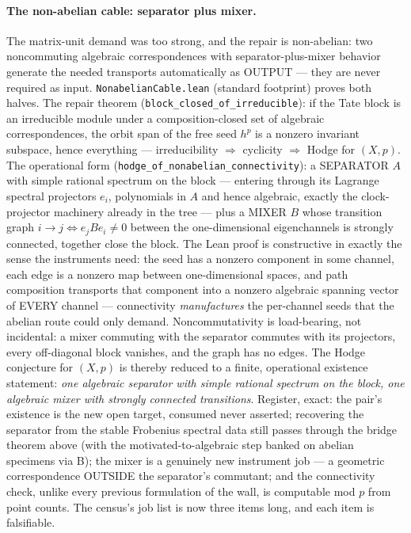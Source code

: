 \documentclass[11pt]{article}
\theoremstyle{definition}
\theoremstyle{remark}
\begin{document}
\paragraph{The non-abelian cable: separator plus mixer.}  The
matrix-unit demand was too strong, and the repair is non-abelian:
two noncommuting algebraic correspondences with separator-plus-mixer
behavior generate the needed transports automatically as OUTPUT ---
they are never required as input.  \texttt{NonabelianCable.lean}
(standard footprint) proves both halves.  The repair theorem
(\texttt{block\_closed\_of\_irreducible}): if the Tate block is an
irreducible module under a composition-closed set of algebraic
correspondences, the orbit span of the free seed $h^p$ is a nonzero
invariant subspace, hence everything --- irreducibility $\Rightarrow$
cyclicity $\Rightarrow$ Hodge for $(X,p)$.  The operational form
(\texttt{hodge\_of\_nonabelian\_connectivity}): a SEPARATOR $A$ with
simple rational spectrum on the block --- entering through its
Lagrange spectral projectors $e_i$, polynomials in $A$ and hence
algebraic, exactly the clock-projector machinery already in the tree
--- plus a MIXER $B$ whose transition graph $i\to j \iff e_jBe_i\neq0$
between the one-dimensional eigenchannels is strongly connected,
together close the block.  The Lean proof is constructive in exactly
the sense the instruments need: the seed has a nonzero component in
some channel, each edge is a nonzero map between one-dimensional
spaces, and path composition transports that component into a nonzero
algebraic spanning vector of EVERY channel --- connectivity
\emph{manufactures} the per-channel seeds that the abelian route
could only demand.  Noncommutativity is load-bearing, not incidental:
a mixer commuting with the separator commutes with its projectors,
every off-diagonal block vanishes, and the graph has no edges.  The
Hodge conjecture for $(X,p)$ is thereby reduced to a finite,
operational existence statement: \emph{one algebraic separator with
simple rational spectrum on the block, one algebraic mixer with
strongly connected transitions}.  Register, exact: the pair's
existence is the new open target, consumed never asserted; recovering
the separator from the stable Frobenius spectral data still passes
through the bridge theorem above (with the motivated-to-algebraic
step banked on abelian specimens via B); the mixer is a genuinely new
instrument job --- a geometric correspondence OUTSIDE the separator's
commutant; and the connectivity check, unlike every previous
formulation of the wall, is computable mod $p$ from point counts.
The census's job list is now three items long, and each item is
falsifiable.
\end{document}
